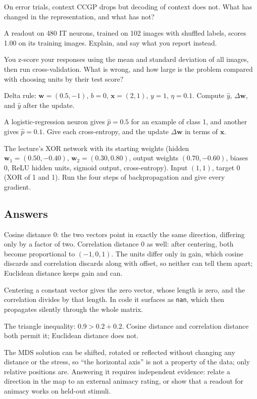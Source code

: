 \documentclass[11pt]{article}
\begin{document}
 On error trials, context CCGP drops but decoding of context does not.
What has changed in the representation, and what has not?

 A readout on 480 IT neurons, trained on 102 images with shuffled labels,
scores 1.00 on its training images. Explain, and say what you report instead.

 You z-score your responses using the mean and standard deviation of all
images, then run cross-validation. What is wrong, and how large is the problem
compared with choosing units by their test score?

 Delta rule: $\mathbf{w}=(0.5,-1)$, $b=0$, $\mathbf{x}=(2,1)$, $y=1$,
$\eta=0.1$. Compute $\hat y$, $\Delta\mathbf{w}$, and $\hat y$ after the update.

 A logistic-regression neuron gives $\hat p=0.5$ for an example of class
1, and another gives $\hat p=0.1$. Give each cross-entropy, and the update
$\Delta\mathbf{w}$ in terms of $\mathbf{x}$.

 The lecture's XOR network with its starting weights (hidden
$\mathbf{w}_1=(0.50,-0.40)$, $\mathbf{w}_2=(0.30,0.80)$, output weights
$(0.70,-0.60)$, biases 0, ReLU hidden units, sigmoid output, cross-entropy).
Input $(1,1)$, target 0 (XOR of 1 and 1). Run the four steps of backpropagation and give every
gradient.

\subsection*{Answers}

 Cosine distance $0$: the two vectors point in exactly the same
direction, differing only by a factor of two. Correlation distance $0$ as well:
after centering, both become proportional to $(-1, 0, 1)$. The units differ only
in gain, which cosine discards and correlation discards along with offset, so
neither can tell them apart; Euclidean distance keeps gain and can.

 Centering a constant vector gives the zero vector, whose length is zero,
and the correlation divides by that length. In code it surfaces as \texttt{nan},
which then propagates silently through the whole matrix.

 The triangle inequality: $0.9 > 0.2 + 0.2$. Cosine distance and
correlation distance both permit it; Euclidean distance does not.

 The MDS solution can be shifted, rotated or reflected without changing
any distance or the stress, so ``the horizontal axis'' is not a property of the
data; only relative positions are. Answering it requires independent evidence:
relate a direction in the map to an external animacy rating, or show that a
readout for animacy works on held-out stimuli.
\end{document}
